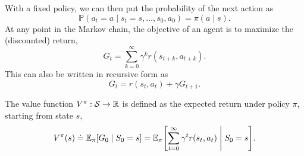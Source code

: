 With a fixed policy, we can then put the probability of the next action as \[
    \mathbb{P}(a_t = a \mid s_t = s, \ldots, s_0, a_0) = \pi(a\mid s).
\]
At any point in the Markov chain, the objective of an agent is to maximize the (discounted) return, \[
    G_t = \sum_{k=0}^{\infty} \gamma^k r(s_{t+k},a_{t+k}).
\]
This can also be written in recursive form as \[
    G_t = r(s_t, a_t) + \gamma G_{t+1}.
\]

\begin{definition}
    The value function $V^\pi: \mathcal{S} \to \mathbb{R}$ is defined as the expected return under policy
    $\pi$, starting from state $s$, \[
        V^\pi(s) \doteq \E_{\pi} \lft[ G_0 \;\middle|\; S_0=s \rgt] = \E_{\pi} \lft[ \sum_{t=0}^{\infty} \gamma^t r(s_t, a_t) \;\middle|\; S_0=s \rgt].
    \]
\end{definition}

